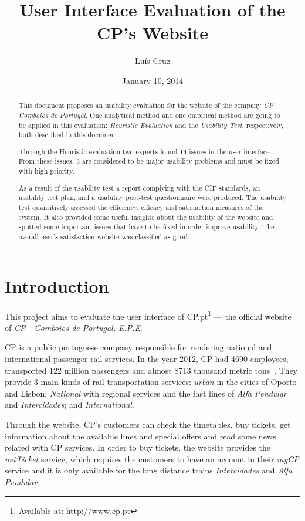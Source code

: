 \documentclass[a4paper]{article}
\title{User Interface Evaluation of the CP's Website}
\author[1]{Luís  Cruz}
\affil[1]{MAP-i\\ Joint Doctoral Programme in Computer Science}
\date{January 10, 2014}
\begin{document}
\maketitle

\begin{abstract}
This document proposes an usability evaluation for the website of the company \emph{CP -- Comboios de Portugal}.
One analytical method and one empirical method are going to be applied in this evaluation: \emph{Heuristic Evaluation} and the \emph{Usability Test}, respectively, both described in this document.
  
Through the Heuristic evaluation two experts found 14 issues in the user interface. From these issues, 3 are considered to be major usability problems and must be fixed with high priority.

As a result of the usability test a report complying with the CIF standards, an usability test plan, and a usability post-test questionnaire were produced. The usability test quantitively assessed the efficiency, efficacy and satisfaction measures of the system. It also provided some useful insights about the usability of the website and spotted some important issues that have to be fixed in order improve usability. The overall user's satisfaction website was classified as good. 

\end{abstract}

\section{Introduction}

This project aims to evaluate the user interface of CP.pt\footnote{Available at: \url{http://www.cp.pt}} --- the official website of \emph{CP - Comboios de Portugal, E.P.E}.

CP is a public portuguese company responsible for rendering national and international passenger rail services. In the year 2012, CP had 4690 employees, transported 122 million passengers and almost 8713 thousand metric tons~\citep{CP2012aa}. They provide 3 main kinds of rail transportation services: \emph{urban} in the cities of Oporto and Lisbon; \emph{National} with regional services and the fast lines of \emph{Alfa Pendular} and \emph{Intercidades}; and \emph{International}.

Through the website, CP's customers can check the timetables, buy tickets, get information about the available lines and special offers and read some news related with CP services. In order to buy tickets, the website provides the \emph{netTicket} service, which requires the customers to have an account in their \emph{myCP} service and it is only available for the long distance trains \emph{Intercidades} and \emph{Alfa Pendular}.
\end{document}
